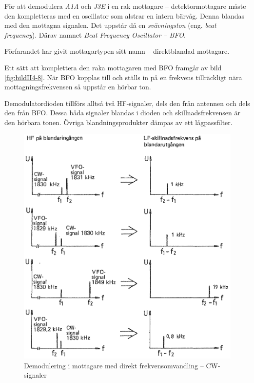 För att demodulera \emph{A1A} och \emph{J3E} i en rak mottagare --
detektormottagare måste den kompletteras med en oscillator som alstrar en
intern bärvåg.
Denna blandas med den mottagna signalen.
Det uppstår då en \emph{svävningston} (eng. \emph{beat frequency}).
Därav namnet \emph{Beat Frequency Oscillator -- BFO}.

Förfarandet har givit mottagartypen sitt namn -- direktblandad mottagare.

Ett sätt att komplettera den raka mottagaren med BFO framgår av bild
\ref{fig:bildII4-8}.
När BFO kopplas till och ställs in på en frekvens tillräckligt
nära mottagningsfrekvensen så uppstår en hörbar ton.

Demodulatordioden tillförs alltså två HF-signaler, dels den från
antennen och dels den från BFO.
Dessa båda signaler blandas i dioden och skillnadsfrekvensen är den hörbara
tonen.
Övriga blandningsprodukter dämpas av ett lågpassfilter.

\begin{figure}
  \includegraphics[width=\textwidth]{images/cropped_pdfs/bild_2_4-09.pdf}
  \caption{Demodulering i mottagare med direkt frekvensomvandling -- CW-signaler}
  \label{fig:bildII4-9}
\end{figure}

